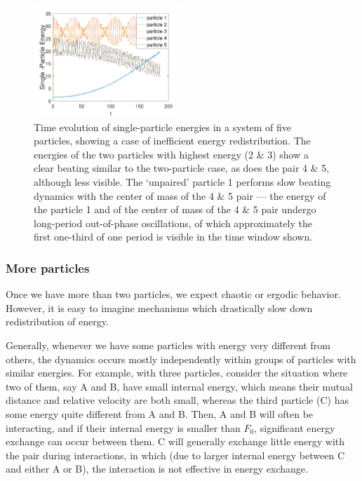 \documentclass[a4paper, onecolumn]{revtex4-1}
\begin{document}
\begin{figure}[tb]
\centering
\includegraphics[width=0.5\textwidth]{ZhiyuPictures/N_5_F0_unknown_E_100_Single_Particle_Energy.pdf}
\caption{Time evolution of single-particle energies in a system of five particles, showing a case of
  inefficient energy redistribution.  The energies of the two particles with highest energy (2 \& 3)
  show a clear beating similar to the two-particle case, as does the pair 4 \& 5, although less
  visible.  The `unpaired' particle 1 performs slow beating dynamics with the center of mass of the
  4 \& 5 pair --- the energy of the particle 1 and of the center of mass of the 4 \& 5 pair undergo
  long-period out-of-phase oscillations, of which approximately the first one-third of one period is
  visible in the time window shown.}
\label{fig:thermalization4}
\end{figure}



\subsubsection{More particles}

Once we have more than two particles, we expect chaotic or ergodic behavior.  However, it is easy to
imagine mechanisms which drastically slow down redistribution of energy.

Generally, whenever we have some particles with energy very different from others, the dynamics
occurs mostly independently within groups of particles with similar energies.  For example, with
three particles, consider the situation where two of them, say A and B, have small internal energy,
which means their mutual distance and relative velocity are both small, whereas the third particle
(C) has some energy quite different from A and B.
%
Then, A and B will often be interacting, and if their internal energy is smaller than $F_0$,
significant energy exchange can occur between them.  C will generally exchange little energy with
the pair during interactions, in which (due to larger internal energy between C and either A or B),
the interaction is not effective in energy exchange.
\end{document}
